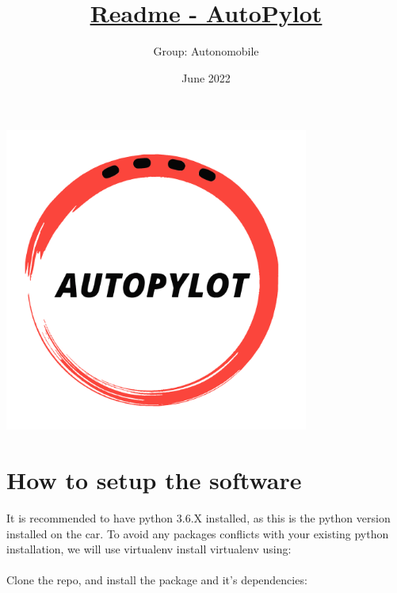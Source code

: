 \documentclass[12pt]{article}
\begin{document}
\title{\underline{Readme  - AutoPylot}}
\date{June 2022}


\author{%
    Group: Autonomobile 
    }

\maketitle

\centerline{\includegraphics[height=10cm]{../../logos/logo-transparent-black.png}}
\newpage

\tableofcontents
\newpage
\section{How to setup the software}

It is recommended to have python 3.6.X installed, as this is the python version installed on the car.
To avoid any packages conflicts with your existing python installation, we will use virtualenv install virtualenv using:\\

\noindent{}\\

Clone the repo, and install the package and it's dependencies:\\

\noindent{}\\
\end{document}
